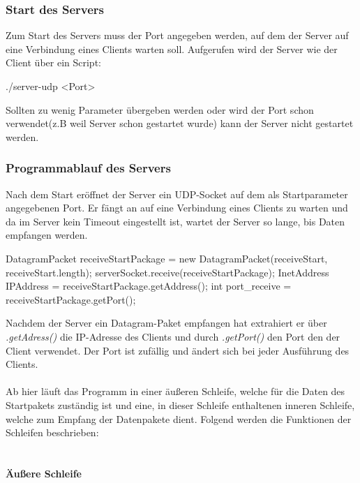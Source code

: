 \documentclass[a4paper, 12pt]{scrartcl}
\begin{document}
\subsubsection{Start des Servers}
Zum Start des Servers muss der Port angegeben werden, auf dem der Server auf eine Verbindung eines Clients warten soll.
Aufgerufen wird der Server wie der Client über ein Script:
\begin{center}
	./server-udp <Port>
\end{center}
Sollten zu wenig Parameter übergeben werden oder wird der Port schon verwendet(z.B weil Server schon gestartet wurde) kann der Server nicht gestartet werden.

\subsubsection{Programmablauf des Servers}
Nach dem Start eröffnet der Server ein UDP-Socket auf dem als Startparameter angegebenen Port.
Er fängt an auf eine Verbindung eines Clients zu warten und da im Server kein Timeout eingestellt ist, wartet der Server so lange, bis Daten empfangen werden.
\begin{javacode}
DatagramPacket receiveStartPackage =  
	new DatagramPacket(receiveStart, receiveStart.length); 
serverSocket.receive(receiveStartPackage); 
InetAddress IPAddress = receiveStartPackage.getAddress();
int port_receive = receiveStartPackage.getPort();
\end{javacode} 
Nachdem der Server ein Datagram-Paket empfangen hat extrahiert er über \textit{.getAdress()} die IP-Adresse des Clients und durch \textit{.getPort()} den Port den der Client verwendet. Der Port ist zufällig und ändert sich bei jeder Ausführung des Clients.\\\\
Ab hier läuft das Programm in einer äußeren Schleife, welche für die Daten des Startpakets zuständig ist und eine, in dieser Schleife enthaltenen inneren Schleife, welche zum Empfang der Datenpakete dient.
Folgend werden die Funktionen der Schleifen beschrieben:\\
\\
\paragraph{Äußere Schleife}
\end{document}
